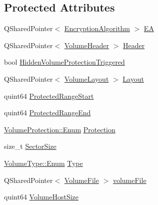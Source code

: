 \subsection*{Protected Attributes}
\begin{DoxyCompactItemize}
\item 
Q\+Shared\+Pointer$<$ \hyperlink{class_gost_crypt_1_1_volume_1_1_encryption_algorithm}{Encryption\+Algorithm} $>$ \hyperlink{class_gost_crypt_1_1_volume_1_1_volume_af8b3ebdf78975b12eb7d662983c4c565}{EA}
\item 
Q\+Shared\+Pointer$<$ \hyperlink{class_gost_crypt_1_1_volume_1_1_volume_header}{Volume\+Header} $>$ \hyperlink{class_gost_crypt_1_1_volume_1_1_volume_a82aafe5660faf704ee1664afa6b52bf3}{Header}
\item 
bool \hyperlink{class_gost_crypt_1_1_volume_1_1_volume_a0909a7940341e9a84898406d3d603a2f}{Hidden\+Volume\+Protection\+Triggered}
\item 
Q\+Shared\+Pointer$<$ \hyperlink{class_gost_crypt_1_1_volume_1_1_volume_layout}{Volume\+Layout} $>$ \hyperlink{class_gost_crypt_1_1_volume_1_1_volume_a8ef22ffab692c4af0b5e1ec9c099c0bb}{Layout}
\item 
quint64 \hyperlink{class_gost_crypt_1_1_volume_1_1_volume_a2ed3823acd6c28f115bc2ea206ce8dd0}{Protected\+Range\+Start}
\item 
quint64 \hyperlink{class_gost_crypt_1_1_volume_1_1_volume_a193dab82b4aed6a353b69f71dbf54a8e}{Protected\+Range\+End}
\item 
\hyperlink{struct_gost_crypt_1_1_volume_1_1_volume_protection_a8dd7301af256c893dc1e0a08c7530c7f}{Volume\+Protection\+::\+Enum} \hyperlink{class_gost_crypt_1_1_volume_1_1_volume_a5084d4117c347b230bd2abbdef483e4a}{Protection}
\item 
size\+\_\+t \hyperlink{class_gost_crypt_1_1_volume_1_1_volume_af26888d1aebbd9e17e87d8436538b1db}{Sector\+Size}
\item 
\hyperlink{struct_gost_crypt_1_1_volume_1_1_volume_type_a7fe1979dab76d4534dcb1e26179d4717}{Volume\+Type\+::\+Enum} \hyperlink{class_gost_crypt_1_1_volume_1_1_volume_ab8e92ff31f20321bcc2203ef9bddb2c2}{Type}
\item 
Q\+Shared\+Pointer$<$ \hyperlink{class_gost_crypt_1_1_volume_1_1_volume_file}{Volume\+File} $>$ \hyperlink{class_gost_crypt_1_1_volume_1_1_volume_a6e7515f849c7299e713b4c0194091d4e}{volume\+File}
\item 
quint64 \hyperlink{class_gost_crypt_1_1_volume_1_1_volume_abe2b20305211a8835e276acda77627c9}{Volume\+Host\+Size}
\item 

\end{DoxyCompactItemize}
